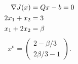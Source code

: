 \begin{align}
\nabla J(x)&=Qx-b=0
  \label{eq:stationary}\\
2x_1+x_2&=3 \notag\\
x_1+2x_2&=\beta
  \label{eq:system}
\end{align}
\[
x^{\mathrm u}=
\begin{pmatrix}2-\beta/3\\2\beta/3-1\end{pmatrix}.
\]

